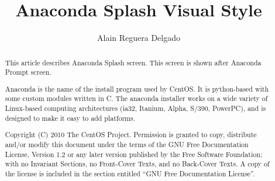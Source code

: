 \documentclass[12pt]{article}
\title{Anaconda Splash Visual Style}
\author{Alain Reguera Delgado}
\begin{document}
\maketitle

\begin{abstract} 

This article describes Anaconda Splash screen. This screen is shown
after Anaconda Prompt screen.

Anaconda is the name of the install program used by CentOS.  It is
python-based with some custom modules written in C. The anaconda
installer works on a wide variety of Linux-based computing
architectures (ia32, Itanium, Alpha, S/390, PowerPC), and is designed
to make it easy to add platforms.

Copyright (C) 2010 The CentOS Project. Permission is granted to copy,
distribute and/or modify this document under the terms of the GNU Free
Documentation License, Version 1.2 or any later version published by
the Free Software Foundation; with no Invariant Sections, no
Front-Cover Texts, and no Back-Cover Texts. A copy of the license is
included in the section entitled ``GNU Free Documentation License''.  

\end{abstract}

\tableofcontents








\end{document}
